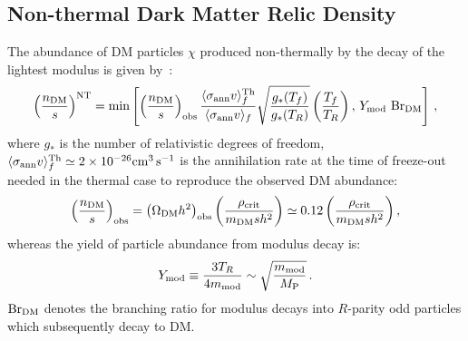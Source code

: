 \documentclass[12pt,a4paper]{book}
\begin{document}
\subsection{Non-thermal Dark Matter Relic Density}

The abundance of DM particles $\chi$ produced non-thermally by the decay of the lightest modulus is given by~\cite{Moroi:1999zb}:
\begin{align}
\label{dmdens}
\left({n_{\rm DM} \over s}\right)^{\rm NT} = {\rm min} \left[\left({n_{\rm DM} \over s}\right)_{\rm obs} {\langle \sigma_{\rm ann} v \rangle_f^{\rm Th} \over \langle \sigma_{\rm ann} v \rangle_f} \sqrt{\frac{g_*(T_f)}{g_*(T_R)}}\left({T_f \over T_R}\right), \, Y_{\rm mod}~ {\rm Br}_{\rm DM} \right] \,,
\end{align}
where $g_*$ is the number of relativistic degrees of freedom, $\langle \sigma_{\rm ann} v \rangle_f^{\rm Th}\simeq 2 \times 10^{-26} {\rm cm}^3\,{\rm s}^{-1}$ is the annihilation rate at the time of freeze-out needed in the thermal case to reproduce the observed DM abundance:
\begin{align}
\left({n_{\rm DM} \over s}\right)_{\rm obs} = \left(\Omega_{\rm DM} h^2\right)_{\rm obs} \left(\frac{\rho_{\rm crit}}{m_{\rm DM} s h^2}\right) \simeq 0.12 \left(\frac{\rho_{\rm crit}}{m_{\rm DM} s h^2}\right),
\label{obs}
\end{align}
whereas the yield of particle abundance from modulus decay is:
\begin{align}
Y_{\rm mod} \equiv {3 T_R \over 4 m_{\rm mod}} \sim \sqrt{\frac{m_{\rm mod}}{M_{\rm P}}}\,.
\label{yield}
\end{align}
${\rm Br}_{\rm DM}$ denotes the branching ratio for modulus decays into $R$-parity odd particles which subsequently decay to DM.\\
\end{document}
